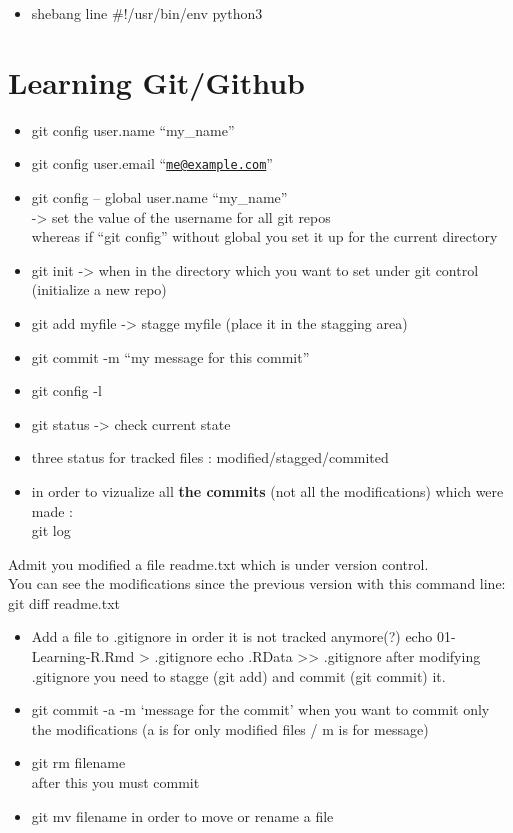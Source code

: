 \documentclass[
]{book}
\providecommand{\tightlist}{%
  \setlength{\itemsep}{0pt}\setlength{\parskip}{0pt}}
\begin{document}
\begin{itemize}
\tightlist
\item
  shebang line
  \#!/usr/bin/env python3
\end{itemize}

\hypertarget{learning-gitgithub}{%
\chapter{Learning Git/Github}\label{learning-gitgithub}}

\begin{itemize}
\item
  git config user.name ``my\_name''
\item
  git config user.email ``\href{mailto:me@example.com}{\nolinkurl{me@example.com}}''
\item
  git config -- global user.name ``my\_name''\\
  -\textgreater{} set the value of the username for all git repos\\
  whereas if ``git config'' without global you set it up for the current directory
\item
  git init -\textgreater{} when in the directory which you want to set under git control (initialize a new repo)
\item
  git add myfile -\textgreater{} stagge myfile (place it in the stagging area)
\item
  git commit -m ``my message for this commit''
\item
  git config -l
\item
  git status -\textgreater{} check current state
\item
  three status for tracked files : modified/stagged/commited
\item
  in order to vizualize all \textbf{the commits} (not all the modifications) which were made :\\
  git log
\end{itemize}

Admit you modified a file readme.txt which is under version control.\\
You can see the modifications since the previous version with this command line:\\
git diff readme.txt

\begin{itemize}
\item
  Add a file to .gitignore in order it is not tracked anymore(?)
  echo 01-Learning-R.Rmd \textgreater{} .gitignore
  echo .RData \textgreater\textgreater{} .gitignore
  after modifying .gitignore you need to stagge (git add) and commit (git commit) it.
\item
  git commit -a -m `message for the commit'
  when you want to commit only the modifications
  (a is for only modified files / m is for message)
\item
  git rm filename\\
  after this you must commit
\item
  git mv filename in order to move or rename a file
\end{itemize}
\end{document}
